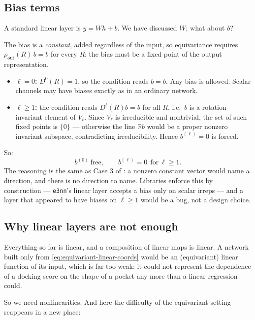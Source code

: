 \documentclass[11pt,a4paper]{report}
\theoremstyle{definition}
\theoremstyle{remark}
\newcommand{\RR}{\mathbb R}
\begin{document}
\subsection{Bias terms}
\label{sec:bias-terms}

A standard linear layer is $y=Wh+b$. We have discussed $W$; what about $b$?

The bias is a \emph{constant}, added regardless of the input, so
equivariance requires $\rho_{\mathrm{out}}(R)\,b = b$ for every $R$: the
bias must be a fixed point of the output representation.

\begin{itemize}
\item \textbf{$\ell=0$:} $D^0(R)=1$, so the condition reads $b=b$. Any bias
is allowed. Scalar channels may have biases exactly as in an ordinary
network.
\item \textbf{$\ell\ge1$:} the condition reads $D^\ell(R)b=b$ for all $R$,
i.e.\ $b$ is a rotation-invariant element of $V_\ell$. Since $V_\ell$ is
irreducible and nontrivial, the set of such fixed points is $\{0\}$ ---
otherwise the line $\RR b$ would be a proper nonzero invariant subspace,
contradicting irreducibility. Hence $b^{(\ell)}=0$ is forced.
\end{itemize}

So:
\[
b^{(0)}\ \text{free},\qquad b^{(\ell)}=0\ \ \text{for}\ \ell\ge1 .
\]
The reasoning is the same as Case 3 of : a nonzero
constant vector would name a direction, and there is no direction to name.
Libraries enforce this by construction --- \texttt{e3nn}'s linear layer
accepts a bias only on scalar irreps --- and a layer that appeared to have
biases on $\ell\ge1$ would be a bug, not a design choice.

\subsection{Why linear layers are not enough}
\label{sec:need-nonlinearity}

Everything so far is linear, and a composition of linear maps is linear. A
network built only from \eqref{eq:equivariant-linear-coords} would be an
(equivariant) linear function of its input, which is far too weak: it could
not represent the dependence of a docking score on the shape of a pocket any
more than a linear regression could.

So we need nonlinearities. And here the difficulty of the equivariant
setting reappears in a new place:
\end{document}
